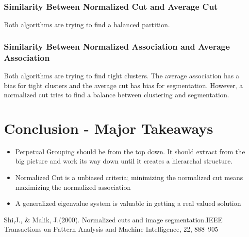 \documentclass[letterpaper, 10 pt, conference]{ieeeconf}  %
\begin{document}
\subsubsection{Similarity Between Normalized Cut and Average Cut} Both algorithms are trying to find a balanced partition.
\smallbreak
\subsubsection{Similarity Between Normalized Association and Average Association} Both algorithms are trying to find tight clusters. 
\smallbreak
The average association has a bias for tight clusters and the average cut has bias for segmentation. However, a normalized cut tries to find a balance between clustering and segmentation.
\section{Conclusion - Major Takeaways}
\begin{itemize}
    \item Perpetual Grouping should be from the top down. It should extract from the big picture and work its way down until it creates a hierarchal structure.
    \smallbreak
    \item Normalized Cut is a unbiased criteria; minimizing the normalized cut means maximizing the normalized association
    \item A generalized eigenvalue system is valuable in getting a real valued solution
\end{itemize}
\addtolength{\textheight}{-12cm}   %













\begin{thebibliography}{99}

Shi,J., \& Malik, J.(2000). Normalized cuts and image segmentation.IEEE Transactions on Pattern Analysis and Machine Intelligence, 22, 888–905





\end{thebibliography}
\end{document}
